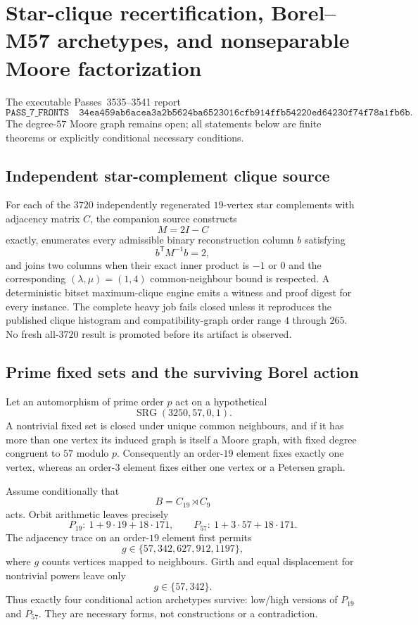 \section{Star-clique recertification, Borel--M57 archetypes, and nonseparable Moore factorization}
\label{sec:bt3535-3541}

The executable Passes~3535--3541 report
\[
\texttt{PASS\_7\_FRONTS}\quad
\texttt{34ea459ab6acea3a2b5624ba6523016cfb914ffb54220ed64230f74f78a1fb6b}.
\]
The degree-$57$ Moore graph remains open; all statements below are finite theorems or explicitly conditional necessary conditions.

\subsection{Independent star-complement clique source}
For each of the $3720$ independently regenerated $19$-vertex star complements with adjacency matrix $C$, the companion source constructs
\[
M=2I-C
\]
exactly, enumerates every admissible binary reconstruction column $b$ satisfying
\[
b^{\mathsf T}M^{-1}b=2,
\]
and joins two columns when their exact inner product is $-1$ or $0$ and the corresponding $(\lambda,\mu)=(1,4)$ common-neighbour bound is respected. A deterministic bitset maximum-clique engine emits a witness and proof digest for every instance. The complete heavy job fails closed unless it reproduces the published clique histogram and compatibility-graph order range $4$ through $265$. No fresh all-$3720$ result is promoted before its artifact is observed.

\subsection{Prime fixed sets and the surviving Borel action}
Let an automorphism of prime order $p$ act on a hypothetical
\[
\operatorname{SRG}(3250,57,0,1).
\]
A nontrivial fixed set is closed under unique common neighbours, and if it has more than one vertex its induced graph is itself a Moore graph, with fixed degree congruent to $57$ modulo $p$. Consequently an order-$19$ element fixes exactly one vertex, whereas an order-$3$ element fixes either one vertex or a Petersen graph.

Assume conditionally that
\[
B=C_{19}\rtimes C_9
\]
acts. Orbit arithmetic leaves precisely
\[
P_{19}:\ 1+9\cdot19+18\cdot171,
\qquad
P_{57}:\ 1+3\cdot57+18\cdot171.
\]
The adjacency trace on an order-$19$ element first permits
\[
g\in\{57,342,627,912,1197\},
\]
where $g$ counts vertices mapped to neighbours. Girth and equal displacement for nontrivial powers leave only
\[
\boxed{g\in\{57,342\}}.
\]
Thus exactly four conditional action archetypes survive: low/high versions of $P_{19}$ and $P_{57}$. They are necessary forms, not constructions or a contradiction.

